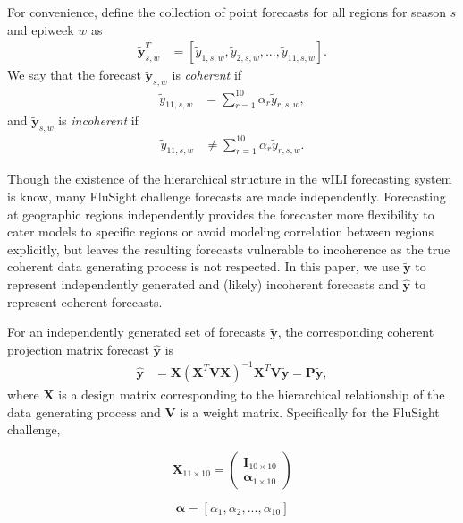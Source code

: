 \documentclass{umassthesis}          %
\begin{document}
 For convenience, define the collection of point forecasts for all regions for season $s$ and epiweek $w$ as
\begin{align}
\tilde{\bm{y}}_{s,w}^T &= [\tilde{y}_{1,s,w},\tilde{y}_{2,s,w},...,\tilde{y}_{11,s,w}].
\end{align}
\noindent We say that the forecast $\tilde{\bm{y}}_{s,w}$ is \emph{coherent} if
\begin{align}
\tilde{y}_{11,s,w} &= \sum_{r=1}^{10} \alpha_r \tilde{y}_{r,s,w},
\end{align}
\noindent and $\tilde{\bm{y}}_{s,w}$ is \emph{incoherent} if
\begin{align}
\tilde{y}_{11,s,w} &\neq \sum_{r=1}^{10} \alpha_r \tilde{y}_{r,s,w}.
\end{align}

Though the existence of the hierarchical structure in the wILI forecasting system is know, many FluSight challenge forecasts are made independently. Forecasting at geographic regions independently provides the forecaster more flexibility to cater models to specific regions or avoid modeling correlation between regions explicitly, but leaves the resulting forecasts vulnerable to incoherence as the true coherent data generating process is not respected. In this paper, we use $\bm{\tilde{y}}$ to represent independently generated and (likely) incoherent forecasts and $\bm{\hat{y}}$ to represent coherent forecasts.

For an independently generated set of forecasts $\bm{\tilde{y}}$, the corresponding coherent projection matrix forecast $\bm{\hat{y}}$ is
\begin{align}
\label{eq:projection}
\bm{\hat{y}} &= \bm{X}(\bm{X}^T \bm{V} \bm{X})^{-1}\bm{X}^T \bm{V} \bm{\tilde{y}} = \bm{P}\bm{\tilde{y}},
\end{align}
\noindent where $\bm{X}$ is a design matrix corresponding to the hierarchical relationship of the data generating process and $\bm{V}$ is a weight matrix. Specifically for the FluSight challenge,




\begin{equation}
\bm{X}_{11 \times 10} =  \begin{pmatrix}
\bm{I}_{10 \times 10} \\
\bm{\alpha}_{1 \times 10} \end{pmatrix}
\end{equation}



\begin{equation}
\bm{\alpha} = [\alpha_1,\alpha_2,...,\alpha_{10}]
\end{equation}
\end{document}
